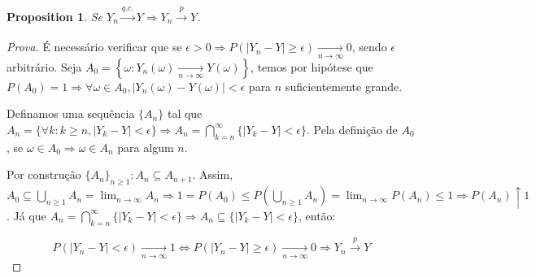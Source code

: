 \documentclass[
]{article}
\newtheorem{proposition}{Proposition}[section]
\theoremstyle{definition}
\theoremstyle{definition}
\theoremstyle{definition}
\theoremstyle{definition}
\theoremstyle{remark}
\begin{document}
\begin{proposition}
Se \(Y_{n} \xrightarrow[]{q.c.}Y \Rightarrow Y_{n} \xrightarrow[]{p}Y\).
\end{proposition}

\begin{proof}[Prova]
É necessário verificar que se \(\epsilon > 0 \Rightarrow P(|Y_{n} - Y| \ge \epsilon) \xrightarrow[n \to \infty]{} 0\), sendo \(\epsilon\) arbitrário. Seja \(A_{0} = \left\{\omega : Y_{n}(\omega) \xrightarrow[n \to \infty]{}Y(\omega)\right\}\), temos por hipótese que \(P(A_{0}) = 1 \Rightarrow \forall \omega \in A_{0}, |Y_{n}(\omega) - Y(\omega)| < \epsilon\) para \(n\) suficientemente grande.

Definamos uma sequência \(\{A_{n}\}\) tal que \(A_{n} = \{\forall k : k \ge n, |Y_{k} - Y| < \epsilon\} \Rightarrow A_{n} = \bigcap_{k=n}^{\infty}\{|Y_{k} - Y| < \epsilon\}\). Pela definição de \(A_{0}\), se \(\omega \in A_{0} \Rightarrow \omega \in A_{n}\) para algum \(n\).

Por construção \(\{A_{n}\}_{n \ge 1} : A_{n} \subseteq A_{n+1}\). Assim, \(A_{0} \subseteq \bigcup_{n \ge 1}A_{n} = \lim_{n \to \infty}A_{n} \Rightarrow 1 = P(A_{0}) \le P\left(\bigcup_{n \ge 1}A_{n}\right) = \lim_{n \to \infty}P(A_{n}) \le 1 \Rightarrow P(A_{n}) \uparrow 1\). Já que \(A_{n} = \bigcap_{k = n}^{\infty}\{|Y_{k} - Y| < \epsilon\} \Rightarrow A_{n} \subseteq \{|Y_{k} - Y| < \epsilon\}\), então:

\begin{equation*}
P(|Y_{n} - Y| < \epsilon) \xrightarrow[n \to \infty]{} 1 \Leftrightarrow P(|Y_{n} - Y| \ge \epsilon) \xrightarrow[n \to \infty]{} 0 \Rightarrow Y_{n} \xrightarrow[]{p}Y
\end{equation*}
\end{proof}
\end{document}
